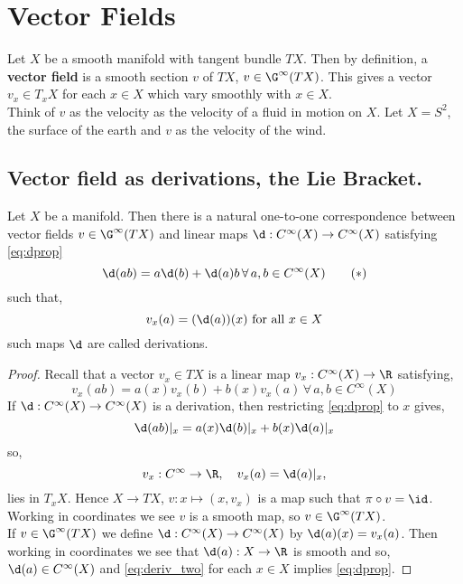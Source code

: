 
\section{Vector Fields}
Let $X$ be a smooth manifold with tangent bundle $TX$. Then by definition, a \textbf{vector field} is a smooth section $v$ of $TX$, $v \in \G^\infty(TX)$. This gives a vector $v_x \in T_xX$ for each $x \in X$ which vary smoothly with $x \in X$.\\

\noindent
Think of $v$ as the velocity as the velocity of a fluid in motion on $X$. Let $X = S^2$, the surface of the earth and $v$ as the velocity of the wind.

\subsection{Vector field as derivations, the Lie Bracket.}
\begin{nprop}\label{prop:oneOne}
   Let $X$ be a manifold. Then there is a natural one-to-one correspondence between vector fields $v \in \G^\infty (TX)$ and linear maps $\d : C^\infty(X) \to C^\infty(X)$ satisfying \eqref{eq:dprop}
   \begin{equation}
     \d (ab) = a \d(b) + \d(a) b\, \forall\, a, b \in C^\infty(X)\tag{$*$}\label{eq:dprop}
   \end{equation}
   such that,
   $$ v_x(a) = (\d(a))(x) \text{ for all } x\in X $$
   such maps $\d$ are called derivations.
\end{nprop}
\begin{proof}
  Recall that a vector $v_x \in TX$ is a linear map $v_x : C^\infty(X) \to \R$ satisfying,
  \begin{equation}
    v_x(ab) = a(x)v_x(b) + b(x)v_x(a) \, \forall\, a, b \in C^\infty(X)\tag{$**$}\label{eq:deriv_two}
  \end{equation}
  If $\d : C^\infty(X) \to C^\infty(X)$ is a derivation, then restricting \eqref{eq:dprop} to $x$ gives,
  $$ \d(ab)|_x = a(x)\d(b)|_x + b(x)\d(a)|_x $$
  so,
  $$ v_x : C^\infty \to \R, \quad v_x(a) = \d(a)|_x, $$
  lies in $T_xX$. Hence $X \to TX$, $v : x \mapsto (x, v_x)$ is a map such that $\pi \circ v = \id$. Working in coordinates we see $v$ is a smooth map, so $v \in \G^\infty(TX)$.\\

  \noindent
  If $v \in \G^\infty(TX)$ we define $\d : C^\infty(X) \to C^\infty(X)$ by $\d(a)(x) = v_x(a)$. Then working in coordinates we see that $\d(a) : X \to \R$ is smooth and so, $\d(a) \in C^\infty(X)$ and \eqref{eq:deriv_two} for each $x \in X$ implies \eqref{eq:dprop}.
\end{proof}

